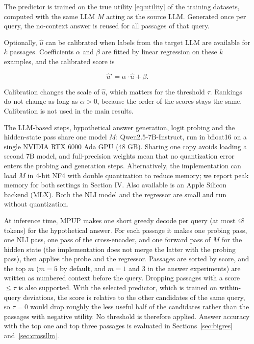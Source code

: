 \documentclass[conference]{IEEEtran}
\begin{document}
The predictor is trained on the true utility \eqref{eq:utility} of the training datasets, computed with the same LLM $M$ acting
as the source LLM. Generated once per query, the no-context answer is reused for all passages of that query.

Optionally, $\hat{u}$ can be calibrated when labels from the target
LLM are available for $k$ passages. Coefficients $\alpha$ and $\beta$ are fitted by linear regression on these $k$ examples, and the calibrated score is

\begin{equation}
    \hat{u}' = \alpha \cdot \hat{u} + \beta.
    \label{eq:calib}
\end{equation}

Calibration changes the scale of $\hat{u}$, which matters for the threshold
$\tau$. Rankings do not change as long as $\alpha > 0$,
because the order of the scores stays the same. Calibration is not
used in the main results.

The LLM-based steps, hypothetical answer generation, logit probing and the hidden-state pass share one model $M$: Qwen2.5-7B-Instruct, run in bfloat16 on
a single NVIDIA RTX 6000 Ada GPU (48 GB). Sharing one copy avoids
loading a second 7B model, and full-precision weights mean that no
quantization error enters the probing and generation steps. Alternatively, the implementation can load $M$ in 4-bit NF4 with double
quantization to reduce memory; we report peak memory for both settings
in Section IV. Also available is an Apple Silicon backend (MLX). Both the NLI model and the regressor are small and run without
quantization.

At inference time, MPUP makes one short greedy decode per query (at
most 48 tokens) for the hypothetical answer. For each passage it makes
one probing pass, one NLI pass, one pass of the cross-encoder, and one forward pass of $M$ for the hidden state (the implementation does not merge the latter with the probing pass), then applies the probe and the regressor. Passages are sorted by score, and the top $m$ ($m = 5$ by default, and $m = 1$ and $3$ in the answer experiments)
are written as numbered context before the query. Dropping passages with a score $\leq \tau$ is also supported. With the selected
predictor, which is trained on within-query deviations, the score is
relative to the other candidates of the same query, so $\tau = 0$
would drop roughly the less useful half of the candidates rather than
the passages with negative utility. No threshold is therefore applied.
Answer accuracy with the top one and top three passages is evaluated in Sections~\ref{sec:bigres} and~\ref{sec:crossllm}.
\end{document}
